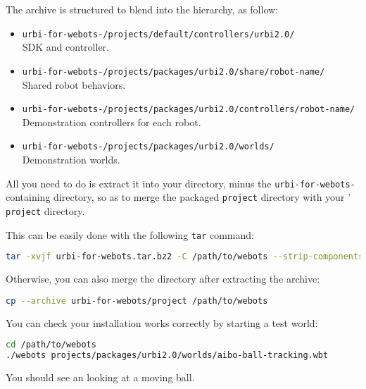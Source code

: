 The archive is structured to blend into the \webots hierarchy, as
follow:

\begin{itemize}
\item \texttt{urbi-for-webots-/projects/default/controllers/urbi2.0/}\\ \urbi{} SDK and
  \webots{} controller.
\item \texttt{urbi-for-webots-/projects/packages/urbi2.0/share/robot-name/}\\ Shared
  \us{} robot behaviors.
\item \texttt{urbi-for-webots-/projects/packages/urbi2.0/controllers/robot-name/}\\
  Demonstration controllers for each robot.
\item \texttt{urbi-for-webots-/projects/packages/urbi2.0/worlds/}\\ Demonstration
  worlds.
\end{itemize}

All you need to do is extract it into your \webots directory, minus the
\texttt{urbi-for-webots-} containing directory, so as to
merge the packaged \texttt{project} directory with your \webots{}'
\texttt{project} directory.

This can be easily done with the following \texttt{tar} command:

\begin{lstlisting}[language=sh]
tar -xvjf urbi-for-webots.tar.bz2 -C /path/to/webots --strip-components 1
\end{lstlisting}

Otherwise, you can also merge the directory after extracting the archive:

\begin{lstlisting}[language=sh]
cp --archive urbi-for-webots/project /path/to/webots
\end{lstlisting}

You can check your installation works correctly by starting a test world:

\begin{lstlisting}[language=sh]
cd /path/to/webots
./webots projects/packages/urbi2.0/worlds/aibo-ball-tracking.wbt
\end{lstlisting}

You should see an \aibo{} looking at a moving ball.

\subsubsection{\macosx{}}

